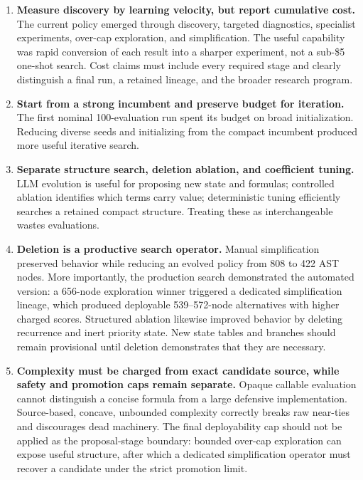 \documentclass[11pt]{article}
\begin{document}
\begin{enumerate}
  \item \textbf{Measure discovery by learning velocity, but report cumulative cost.}
  The current policy emerged through discovery, targeted diagnostics, specialist
  experiments, over-cap exploration, and simplification.  The useful capability was
  rapid conversion of each result into a sharper experiment, not a sub-\$5 one-shot
  search.  Cost claims must include every required stage and clearly distinguish a
  final run, a retained lineage, and the broader research program.

  \item \textbf{Start from a strong incumbent and preserve budget for iteration.}  The
  first nominal 100-evaluation run spent its budget on broad initialization.  Reducing
  diverse seeds and initializing from the compact incumbent produced more useful
  iterative search.

  \item \textbf{Separate structure search, deletion ablation, and coefficient tuning.}
  LLM evolution is useful for proposing new state and formulas; controlled ablation
  identifies which terms carry value; deterministic tuning efficiently searches a
  retained compact structure.  Treating these as interchangeable wastes evaluations.

  \item \textbf{Deletion is a productive search operator.}  Manual simplification
  preserved behavior while reducing an evolved policy from 808 to 422 AST nodes.
  More importantly, the production search demonstrated the automated version: a
  656-node exploration winner triggered a dedicated simplification lineage, which
  produced deployable 539--572-node alternatives with higher charged scores.
  Structured ablation likewise improved behavior by deleting recurrence and inert
  priority state.  New state tables and branches should remain provisional until
  deletion demonstrates that they are necessary.

  \item \textbf{Complexity must be charged from exact candidate source, while safety
  and promotion caps remain separate.}  Opaque callable evaluation cannot distinguish
  a concise formula from a large defensive implementation.  Source-based, concave,
  unbounded complexity correctly breaks raw near-ties and discourages dead machinery.
  The final deployability cap should not be applied as the proposal-stage boundary:
  bounded over-cap exploration can expose useful structure, after which a dedicated
  simplification operator must recover a candidate under the strict promotion limit.


\end{enumerate}
\end{document}
